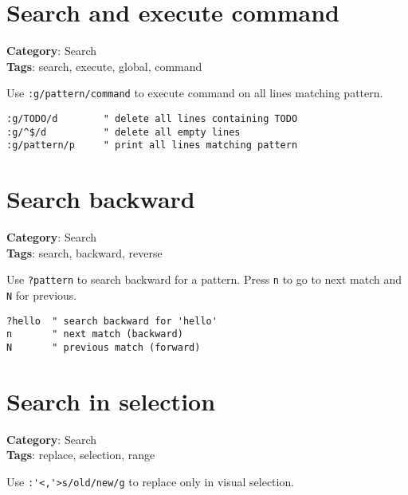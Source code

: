 {{{{{{{{{{{{{\section{Search and execute command}

\textbf{Category}: Search\\ \textbf{Tags}: search, execute, global, command
\vspace{0.5cm}

Use {\footnotesize \Verb§:g/pattern/command§} to execute command on all lines matching pattern.

\begin{Exa*}{}
\begin{Verbatim}[fontsize=\footnotesize, breaklines, breakanywhere]
:g/TODO/d        " delete all lines containing TODO
:g/^$/d          " delete all empty lines
:g/pattern/p     " print all lines matching pattern
\end{Verbatim}
\end{Exa*}

\section{Search backward}

\textbf{Category}: Search\\ \textbf{Tags}: search, backward, reverse
\vspace{0.5cm}

Use {\footnotesize \Verb§?pattern§} to search backward for a pattern. Press {\footnotesize \Verb§n§} to go to next match and {\footnotesize \Verb§N§} for previous.

\begin{Exa*}{}
\begin{Verbatim}[fontsize=\footnotesize, breaklines, breakanywhere]
?hello  " search backward for 'hello'
n       " next match (backward)
N       " previous match (forward)
\end{Verbatim}
\end{Exa*}

\section{Search in selection}

\textbf{Category}: Search\\ \textbf{Tags}: replace, selection, range
\vspace{0.5cm}

Use {\footnotesize \Verb§:'<,'>s/old/new/g§} to replace only in visual selection.

}}}}}}}}}}}}}
